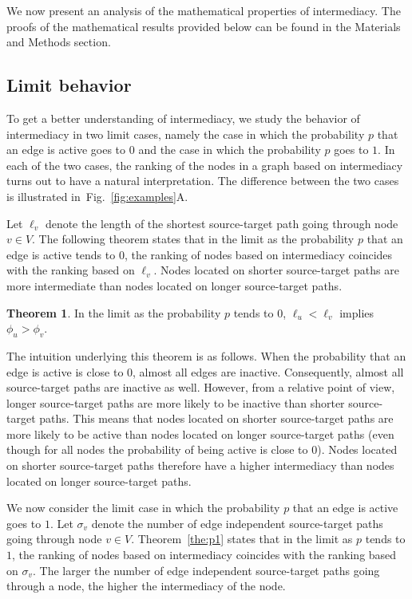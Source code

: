 \documentclass[9pt,twocolumn,twoside]{pnas-alt} %
\theoremstyle{definition}
\newtheorem{theorem}{Theorem}
\newcommand{\subfigref}[2]{Fig.~\ref{fig:#1}#2\xspace}
\newcommand{\theref}[1]{Theorem~\ref{the:#1}\xspace}
\begin{document}
We now present an analysis of the mathematical properties of intermediacy. The proofs of the mathematical results provided below can be found in the Materials and Methods section.

%
%

\subsection*{\label{sec:limit}Limit behavior}

To get a better understanding of intermediacy, we study the behavior of intermediacy in two limit cases, namely the case in which the probability $p$ that an edge is active goes to $0$ and the case in which the probability $p$ goes to $1$. In each of the two cases, the ranking of the nodes in a graph based on intermediacy turns out to have a natural interpretation. The difference between the two cases is illustrated in~\subfigref{examples}{A}.

Let $\ell_v$ denote the length of the shortest source-target path going through node $v \in V$. The following theorem states that in the limit as the probability $p$ that an edge is active tends to $0$, the ranking of nodes based on intermediacy coincides with the ranking based on $\ell_v$. Nodes located on shorter source-target paths are more intermediate than nodes located on longer source-target paths.

\begin{theorem}
    In the limit as the probability $p$ tends to $0$, $\ell_u < \ell_v$ implies $\phi_u > \phi_v$.
    \label{the:p0}
\end{theorem}

The intuition underlying this theorem is as follows. When the probability that an edge is active is close to $0$, almost all edges are inactive. Consequently, almost all source-target paths are inactive as well. However, from a relative point of view, longer source-target paths are more likely to be inactive than shorter source-target paths. This means that nodes located on shorter source-target paths are more likely to be active than nodes located on longer source-target paths (even though for all nodes the probability of being active is close to $0$). Nodes located on shorter source-target paths therefore have a higher intermediacy than nodes located on longer source-target paths.

We now consider the limit case in which the probability $p$ that an edge is active goes to $1$. Let $\sigma_v$ denote the number of edge independent source-target paths going through node $v \in V$. \theref{p1} states that in the limit as $p$ tends to $1$, the ranking of nodes based on intermediacy coincides with the ranking based on $\sigma_v$. The larger the number of edge independent source-target paths going through a node, the higher the intermediacy of the node.
\end{document}
